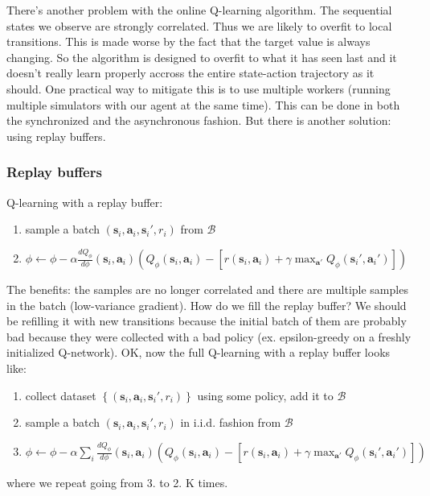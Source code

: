 \documentclass{report}
\begin{document}
There's another problem with the online Q-learning algorithm.
The sequential states we observe are strongly correlated. 
Thus we are likely to overfit to local transitions.
This is made worse by the fact that the target value is always changing.
So the algorithm is designed to overfit to what it has seen last and it doesn't really learn
properly accross the entire state-action trajectory as it should.
One practical way to mitigate this is to use multiple workers (running multiple simulators with our agent at the same time).
This can be done in both the synchronized and the asynchronous fashion.
But there is another solution: using replay buffers.

\subsubsection{Replay buffers}
Q-learning with a replay buffer:
\begin{enumerate}
		\item sample a batch $\left( \bm{s}_i, \bm{a}_i, \bm{s}_i', r_i \right) $ from $\mathcal{B}$
		\item $  \phi \leftarrow \phi  - \alpha \frac{d Q_\phi}{d\phi} (\bm{s}_{i}, \bm{a}_{i}) \left( Q_\phi(\bm{s}_{i}, \bm{a}_{i}) - 
			\left[ r(\bm{s}_{i}, \bm{a}_{i}) + \gamma \max_{\bm{a}'} Q_\phi (\bm{s}_{i}', \bm{a}_{i}') \right] 	\right) $ 
\end{enumerate}
The benefits: the samples are no longer correlated and there are multiple samples in the batch (low-variance gradient).
How do we fill the replay buffer?
We should be refilling it with new transitions because the initial batch of them are probably bad because they were collected with a bad policy (ex. epsilon-greedy 
on a freshly initialized Q-network).
OK, now the full Q-learning with a replay buffer looks like:
\begin{enumerate}
		\item collect dataset $\left\{ \left( \bm{s}_i, \bm{a}_i, \bm{s}_i', r_i \right)  \right\} $ using some policy, add it to $\mathcal{B}$
		\item sample a batch  $\left( \bm{s}_i, \bm{a}_i, \bm{s}_i', r_i \right)$ in i.i.d. fashion from $\mathcal{B}$
		\item $  \phi \leftarrow \phi  - \alpha \sum_{i}^{}  \frac{d Q_\phi}{d\phi} (\bm{s}_{i}, \bm{a}_{i}) \left( Q_\phi(\bm{s}_{i}, \bm{a}_{i}) - 
			\left[ r(\bm{s}_{i}, \bm{a}_{i}) + \gamma \max_{\bm{a}'} Q_\phi (\bm{s}_{i}', \bm{a}_{i}') \right] 	\right) $ 
\end{enumerate}
where we repeat going from 3. to 2. K times.
\end{document}
